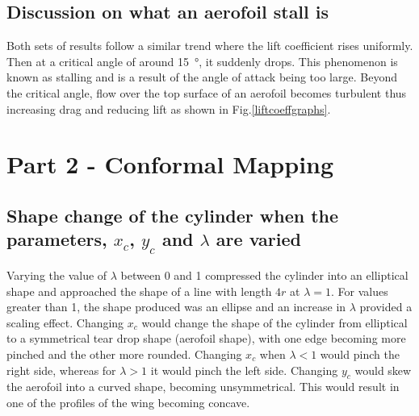 \documentclass[11pt]{article}
\begin{document}
\subsection*{Discussion on what an aerofoil stall is}
Both sets of results follow a similar trend where the lift coefficient rises uniformly. Then at a critical angle of around \SI{15}{\degree}, it suddenly drops. This phenomenon is known as stalling and is a result of the angle of attack being too large. Beyond the critical angle, flow over the top surface of an aerofoil becomes turbulent thus increasing drag and reducing lift as shown in Fig.\ref{liftcoeffgraphs}.
\section*{Part 2 - Conformal Mapping}
\subsection*{Shape change of the cylinder when the parameters, $x_c$, $y_c$ and $\lambda$ are varied}
Varying the value of $\lambda$ between 0 and 1 compressed the cylinder into an elliptical shape and approached the shape of a line with length $4r$ at $\lambda = 1$. For values greater than 1, the shape produced was an ellipse and an increase in $\lambda$ provided a scaling effect. Changing $x_c$ would change the shape of the cylinder from elliptical to a symmetrical tear drop shape (aerofoil shape), with one edge becoming more pinched and the other more rounded. Changing $x_c$ when $\lambda < 1$ would pinch the right side, whereas for $\lambda >1$ it would pinch the left side. Changing $y_c$ would skew the aerofoil into a curved shape, becoming unsymmetrical. This would result in one of the profiles of the wing becoming concave. 
\end{document}
